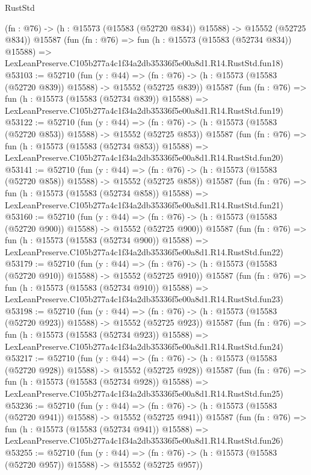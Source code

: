 \begin{lexlean}{RustStd}
\begin{coremodule}
    (fn : @76) -> (h : @15573 (@15583 (@52720 @834)) @15588) -> @15552 (@52725 @834))
    @15587
    (fun (fn : @76) =>
    fun (h : @15573 (@15583 (@52734 @834)) @15588) =>
    LexLeanPreserve.C105b277a4c1f34a2db35336f5e00a8d1.R14.RustStd.fun18)
@53103 := @52710
    (fun (y : @44) =>
    (fn : @76) -> (h : @15573 (@15583 (@52720 @839)) @15588) -> @15552 (@52725 @839))
    @15587
    (fun (fn : @76) =>
    fun (h : @15573 (@15583 (@52734 @839)) @15588) =>
    LexLeanPreserve.C105b277a4c1f34a2db35336f5e00a8d1.R14.RustStd.fun19)
@53122 := @52710
    (fun (y : @44) =>
    (fn : @76) -> (h : @15573 (@15583 (@52720 @853)) @15588) -> @15552 (@52725 @853))
    @15587
    (fun (fn : @76) =>
    fun (h : @15573 (@15583 (@52734 @853)) @15588) =>
    LexLeanPreserve.C105b277a4c1f34a2db35336f5e00a8d1.R14.RustStd.fun20)
@53141 := @52710
    (fun (y : @44) =>
    (fn : @76) -> (h : @15573 (@15583 (@52720 @858)) @15588) -> @15552 (@52725 @858))
    @15587
    (fun (fn : @76) =>
    fun (h : @15573 (@15583 (@52734 @858)) @15588) =>
    LexLeanPreserve.C105b277a4c1f34a2db35336f5e00a8d1.R14.RustStd.fun21)
@53160 := @52710
    (fun (y : @44) =>
    (fn : @76) -> (h : @15573 (@15583 (@52720 @900)) @15588) -> @15552 (@52725 @900))
    @15587
    (fun (fn : @76) =>
    fun (h : @15573 (@15583 (@52734 @900)) @15588) =>
    LexLeanPreserve.C105b277a4c1f34a2db35336f5e00a8d1.R14.RustStd.fun22)
@53179 := @52710
    (fun (y : @44) =>
    (fn : @76) -> (h : @15573 (@15583 (@52720 @910)) @15588) -> @15552 (@52725 @910))
    @15587
    (fun (fn : @76) =>
    fun (h : @15573 (@15583 (@52734 @910)) @15588) =>
    LexLeanPreserve.C105b277a4c1f34a2db35336f5e00a8d1.R14.RustStd.fun23)
@53198 := @52710
    (fun (y : @44) =>
    (fn : @76) -> (h : @15573 (@15583 (@52720 @923)) @15588) -> @15552 (@52725 @923))
    @15587
    (fun (fn : @76) =>
    fun (h : @15573 (@15583 (@52734 @923)) @15588) =>
    LexLeanPreserve.C105b277a4c1f34a2db35336f5e00a8d1.R14.RustStd.fun24)
@53217 := @52710
    (fun (y : @44) =>
    (fn : @76) -> (h : @15573 (@15583 (@52720 @928)) @15588) -> @15552 (@52725 @928))
    @15587
    (fun (fn : @76) =>
    fun (h : @15573 (@15583 (@52734 @928)) @15588) =>
    LexLeanPreserve.C105b277a4c1f34a2db35336f5e00a8d1.R14.RustStd.fun25)
@53236 := @52710
    (fun (y : @44) =>
    (fn : @76) -> (h : @15573 (@15583 (@52720 @941)) @15588) -> @15552 (@52725 @941))
    @15587
    (fun (fn : @76) =>
    fun (h : @15573 (@15583 (@52734 @941)) @15588) =>
    LexLeanPreserve.C105b277a4c1f34a2db35336f5e00a8d1.R14.RustStd.fun26)
@53255 := @52710
    (fun (y : @44) =>
    (fn : @76) -> (h : @15573 (@15583 (@52720 @957)) @15588) -> @15552 (@52725 @957))

\end{coremodule}
\end{lexlean}
